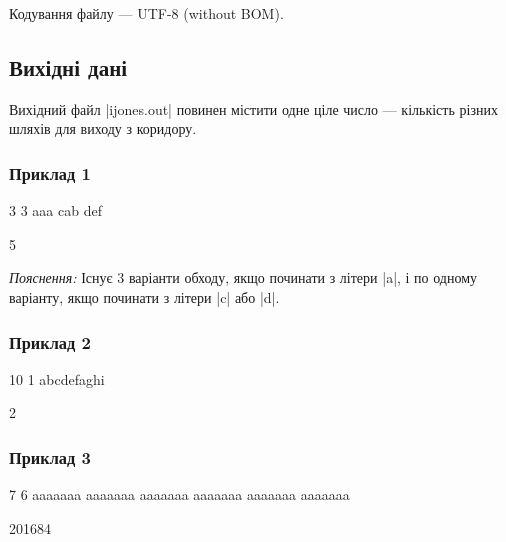 \documentclass[12pt,a4paper]{article}
\begin{document}
Кодування файлу --- UTF-8 (without BOM).


\subsection*{Вихідні дані}

Вихідний файл |ijones.out| повинен містити одне ціле число --- кількість різних шляхів для виходу з коридору.


\pagebreak


\subsubsection*{Приклад 1}

\textbf{}

\begin{codeblock}
3 3
aaa
cab
def
\end{codeblock}

\textbf{}

\begin{codeblock}
5
\end{codeblock}

\emph{Пояснення:} Існує 3 варіанти обходу, якщо починати з літери |a|, і по одному варіанту, якщо починати з літери |c| або |d|.


\subsubsection*{Приклад 2}

\textbf{}

\begin{codeblock}
10 1
abcdefaghi
\end{codeblock}

\textbf{}

\begin{codeblock}
2
\end{codeblock}


\subsubsection*{Приклад 3}

\textbf{}

\begin{codeblock}
7 6
aaaaaaa
aaaaaaa
aaaaaaa
aaaaaaa
aaaaaaa
aaaaaaa
\end{codeblock}

\textbf{}

\begin{codeblock}
201684
\end{codeblock}
\end{document}
